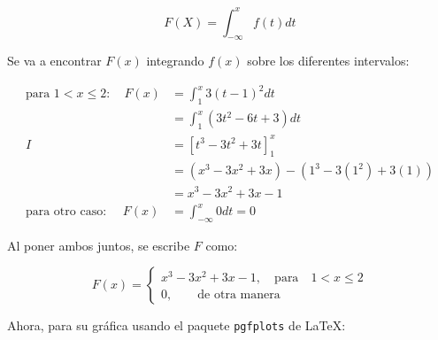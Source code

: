 \documentclass[12pt]{article}
\begin{document}
\[
F(X) = \int_{-\infty}^{x} f(t) dt
\]

Se va a encontrar $F(x)$ integrando $f(x)$ sobre los diferentes intervalos:

\begin{align*}
  \text{para } 1 < x \leq 2 : \quad F(x) &= \int_{1}^{x} 3(t-1)^{2} dt \\ 
                                         &= \int_{1}^{x} (3t^{2} - 6t + 3) dt \\ 
                                        I&= [t^{3} - 3t^{2} + 3t]_{1}^{x} \\ 
                                         &= (x^{3} - 3x^{2} + 3x) - (1^{3} - 3(1^{2}) + 3(1)) \\ 
                                         &= x^{3} - 3x^{2} + 3x - 1 \\
  \text{para otro caso: } \quad F(x) &= \int_{-\infty}^{x} 0 dt = 0 
\end{align*}

Al poner ambos juntos, se escribe $F$ como:


\[
F (x) =
\begin{cases}
  x^{3} - 3x^{2} + 3x - 1, \quad \text{para} \quad 1 < x \leq 2 \\
  0, \qquad \text{de otra manera}
\end{cases}
\]

Ahora, para su gráfica usando el paquete \texttt{pgfplots} de \LaTeX:

\begin{center}

\end{center}
\end{document}
